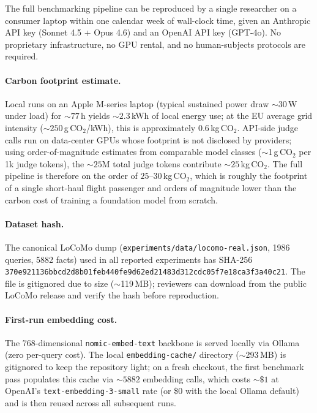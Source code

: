 \documentclass{article}
\begin{document}
The full benchmarking pipeline can be reproduced by a single
researcher on a consumer laptop within one calendar week of wall-clock
time, given an Anthropic API key (Sonnet 4.5 + Opus 4.6) and an OpenAI
API key (GPT-4o). No proprietary infrastructure, no GPU rental, and no
human-subjects protocols are required.

\paragraph{Carbon footprint estimate.}
Local runs on an Apple M-series laptop (typical sustained power draw
${\sim}30$\,W under load) for ${\sim}77$\,h yields ${\sim}2.3$\,kWh of
local energy use; at the EU average grid intensity (${\sim}250$\,g\,CO$_2$/kWh),
this is approximately $0.6$\,kg\,CO$_2$. API-side judge calls run on
data-center GPUs whose footprint is not disclosed by providers; using
order-of-magnitude estimates from comparable model classes
($\sim$1\,g\,CO$_2$ per 1k judge tokens), the ${\sim}25$M total judge
tokens contribute ${\sim}25$\,kg\,CO$_2$. The full pipeline is therefore
on the order of $25$--$30$\,kg\,CO$_2$, which is roughly the footprint of
a single short-haul flight passenger and orders of magnitude lower than
the carbon cost of training a foundation model from scratch.

\paragraph{Dataset hash.}
The canonical LoCoMo dump (\texttt{experiments/data/locomo-real.json},
1986 queries, 5882 facts) used in all reported experiments has SHA-256
\texttt{370e921136bbcd2d8b01feb440fe9d62ed21483d312cdc05f7e18ca3f3a40c21}.
The file is gitignored due to size ($\sim$119\,MB); reviewers can
download from the public LoCoMo release \citep{maharana2024locomo} and
verify the hash before reproduction.

\paragraph{First-run embedding cost.}
The 768-dimensional \texttt{nomic-embed-text} backbone is served locally
via Ollama (zero per-query cost). The local \texttt{embedding-cache/}
directory ($\sim$293\,MB) is gitignored to keep the repository light;
on a fresh checkout, the first benchmark pass populates this cache via
${\sim}5882$ embedding calls, which costs ${\sim}\$1$ at OpenAI's
\texttt{text-embedding-3-small} rate (or \$0 with the local Ollama
default) and is then reused across all subsequent runs.
\end{document}

